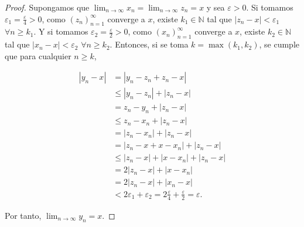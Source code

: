 \documentclass[
  a4paper,
]{scrreport}
\theoremstyle{definition}
\theoremstyle{plain}
\theoremstyle{definition}
\theoremstyle{plain}
\theoremstyle{plain}
\theoremstyle{remark}
\begin{document}
\begin{tcolorbox}[enhanced jigsaw, breakable, arc=.35mm, colbacktitle=quarto-callout-note-color!10!white, toptitle=1mm, opacityback=0, colframe=quarto-callout-note-color-frame, colback=white, left=2mm, bottomrule=.15mm, opacitybacktitle=0.6, title=\textcolor{quarto-callout-note-color}{\faInfo}\hspace{0.5em}{Demostración}, toprule=.15mm, titlerule=0mm, coltitle=black, rightrule=.15mm, bottomtitle=1mm, leftrule=.75mm]

\begin{proof}

Supongamos que \(\lim_{n\to\infty} x_n = \lim_{n\to\infty} z_n=x\) y sea
\(\varepsilon>0\). Si tomamos \(\varepsilon_1=\frac{\varepsilon}{4}>0\),
como \((z_n)_{n=1}^\infty\) converge a \(x\), existe
\(k_1\in\mathbb{N}\) tal que \(|z_n-x|<\varepsilon_1\)
\(\forall n\geq k_1\). Y si tomamos
\(\varepsilon_2 = \frac{\varepsilon}{2}>0\), como \((x_n)_{n=1}^\infty\)
converge a \(x\), existe \(k_2\in\mathbb{N}\) tal que
\(|x_n-x|<\varepsilon_2\) \(\forall n\geq k_2\). Entonces, si se toma
\(k=\max(k_1,k_2)\), se cumple que para cualquier \(n\geq k\),

\begin{align*}
|y_n-x| &= |y_n-z_n+z_n-x| \\
&\leq |y_n-z_n|+|z_n-x| \tag{prop.2.4 (f)}\\
&= z_n-y_n+|z_n-x| \\
&\leq z_n-x_n+|z_n-x| \\
&= |z_n-x_n|+|z_n-x| \\
&= |z_n-x+x-x_n|+|z_n-x| \\
&\leq |z_n-x|+|x-x_n|+|z_n-x| \\
&= 2|z_n-x|+|x-x_n| \tag{prop.2.4 (f)}\\
&= 2|z_n-x|+|x_n-x| \tag{prop.2.4 (b)}\\ 
&< 2\varepsilon_1+\varepsilon_2 = 2\frac{\varepsilon}{4}+\frac{\varepsilon}{2}=\varepsilon.
\end{align*}

Por tanto, \(\lim_{n\to\infty} y_n=x\).

\end{proof}

\end{tcolorbox}
\end{document}
